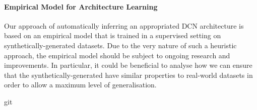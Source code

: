 \paragraph{Empirical Model for Architecture Learning} Our approach of automatically inferring an appropriated DCN architecture is based on an empirical model that is trained in a supervised setting on synthetically-generated datasets. Due to the very nature of such a heuristic approach, the empirical model should be subject to ongoing research and improvements. In particular, it could be beneficial to analyse how we can ensure that the synthetically-generated have similar properties to real-world datasets in order to allow a maximum level of generalisation.  

git 


%



